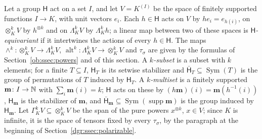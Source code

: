 Let a group $\mathsf H$ act on a set $I$, and let $V=K^{(I)}$ be the space of finitely supported functions $I\to K$, with
unit vectors $e_i$. Each $h\in\mathsf H$ acts on $V$ by $he_i=e_{h(i)}$, on $\otimes^k_KV$ by $h^{\otimes k}$ and on
$\Lambda^k_KV$ by $\Lambda^k_Kh$; a linear map between two of these spaces is \emph{$\mathsf H$\nobreakdash-equivariant}
if it intertwines the actions of every $h\in\mathsf H$. The maps $\wedge^k\colon\otimes^k_KV\to\Lambda^k_KV$,
$\operatorname{alt}^k\colon\Lambda^k_KV\to\otimes^k_KV$ and $\tau_\sigma$ are given by the formulas of
Section~\ref{ob:ssec:powers} and of this section. A \emph{$k$\nobreakdash-subset} is a subset with $k$ elements; for a
finite $T\subseteq I$, $\mathsf H_T$ is its setwise stabilizer and $\bar{\mathsf H}_T\subseteq\operatorname{Sym}(T)$ is
the group of permutations of $T$ induced by $\mathsf H_T$. A \emph{$k$\nobreakdash-multiset} is a finitely supported
$\mathbf m\colon I\to\mathbb N$ with $\sum_i\mathbf m(i)=k$; $\mathsf H$ acts on these by
$(h\mathbf m)(i)=\mathbf m(h^{-1}(i))$, $\mathsf H_{\mathbf m}$ is the stabilizer of $\mathbf m$, and
$\bar{\mathsf H}_{\mathbf m}\subseteq\operatorname{Sym}(\operatorname{supp}\mathbf m)$ is the group induced by
$\mathsf H_{\mathbf m}$.
Let $\Gamma^k_KV\subseteq\otimes^k_KV$ be the span of the pure powers $x^{\otimes k}$, $x\in V$; since $K$ is infinite,
it is the space of tensors fixed by every $\tau_\sigma$, by the paragraph at the beginning of
Section~\ref{dgr:ssec:polarizable}.

